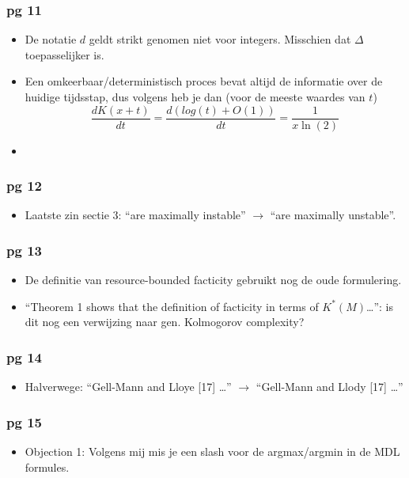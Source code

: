 \documentclass{article}
\theoremstyle{definition}
\begin{document}
\subsubsection*{pg 11}
\begin{itemize}
  \item De notatie $d$ geldt strikt genomen niet voor integers. Misschien dat $\Delta$ toepasselijker is.
  \item Een omkeerbaar/deterministisch proces bevat altijd de informatie over de huidige tijdsstap, dus volgens heb je dan (voor de meeste waardes van $t$) 
\[
\frac{dK(x+t)}{dt} = \frac{d(log(t) + O(1))}{dt} = \frac{1}{x \ln(2)}
\]
\item 
\end{itemize}

\subsubsection*{pg 12}
\begin{itemize}
  \item Laatste zin sectie 3: ``are maximally instable'' $\rightarrow$ ``are maximally unstable''.
\end{itemize}

\subsubsection*{pg 13}
\begin{itemize}
  \item De definitie van resource-bounded facticity gebruikt nog de oude formulering.
  \item ``Theorem 1 shows that the definition of facticity in terms of $K^*(M)$\ldots'': is dit nog een verwijzing naar gen. Kolmogorov complexity? 
\end{itemize}

\subsubsection*{pg 14}
\begin{itemize}
  \item Halverwege: ``Gell-Mann and Lloye [17] \ldots''  $\rightarrow$ ``Gell-Mann and Llody [17] \ldots''
\end{itemize}

\subsubsection*{pg 15}
\begin{itemize}
  \item Objection 1: Volgens mij mis je een slash voor de argmax/argmin in de MDL formules.
\end{itemize}
\end{document}
